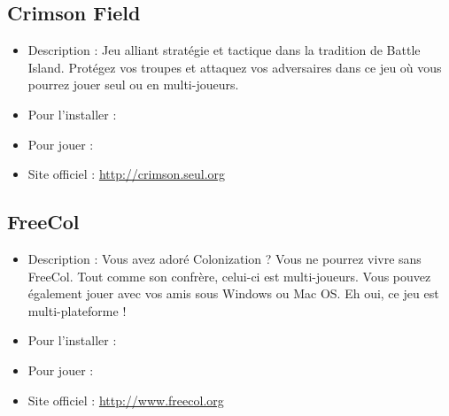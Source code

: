 \subsection{Crimson Field}
\begin{itemize}
\begingroup
{}
\item Description : Jeu alliant stratégie et tactique dans la tradition de Battle Island. Protégez vos troupes et attaquez vos adversaires dans ce jeu où vous pourrez jouer seul ou en multi-joueurs.{\par}
\item Pour l'installer : 
\item Pour jouer : 
\item Site officiel : \url{http://crimson.seul.org}{\par}
\endgroup
\end{itemize}
\subsection{FreeCol}
\begin{itemize}
\begingroup
{}
\item Description : Vous avez adoré Colonization ? Vous ne pourrez vivre sans FreeCol. Tout comme son confrère, celui-ci est multi-joueurs. Vous pouvez également jouer avec vos amis sous Windows ou Mac OS. Eh oui, ce jeu est multi-plateforme !{\par}
\item Pour l'installer : 
\item Pour jouer : 
\item Site officiel : \url{http://www.freecol.org}{\par}
\endgroup
\end{itemize}
\newpage
